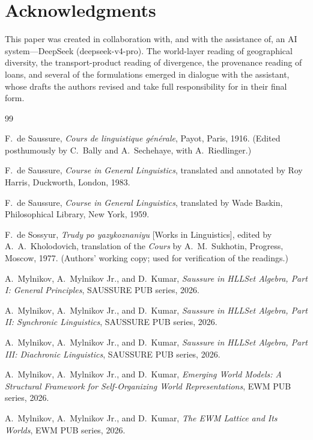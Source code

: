 \documentclass[11pt,a4paper]{article}
\theoremstyle{remark}
\begin{document}
\section*{Acknowledgments}
This paper was created in collaboration with, and with the assistance of, an
AI system---DeepSeek (deepseek-v4-pro). The world-layer reading of
geographical diversity, the transport-product reading of divergence, the
provenance reading of loans, and several of the formulations emerged in
dialogue with the assistant, whose drafts the authors revised and take full
responsibility for in their final form.

\begin{thebibliography}{99}

 F.~de Saussure,
\textit{Cours de linguistique g\'en\'erale}, Payot, Paris, 1916.
(Edited posthumously by C.~Bally and A.~Sechehaye, with A.~Riedlinger.)

 F.~de Saussure,
\textit{Course in General Linguistics}, translated and annotated by
Roy Harris, Duckworth, London, 1983.

 F.~de Saussure,
\textit{Course in General Linguistics}, translated by Wade Baskin,
Philosophical Library, New York, 1959.

 F.~de Sossyur,
\textit{Trudy po yazykoznaniyu} [Works in Linguistics], edited by
A.~A.~Kholodovich, translation of the \textit{Cours} by A.~M.~Sukhotin,
Progress, Moscow, 1977.
(Authors' working copy; used for verification of the readings.)

 A.~Mylnikov, A.~Mylnikov Jr., and D.~Kumar,
\textit{Saussure in HLLSet Algebra, Part I: General Principles},
SAUSSURE PUB series, 2026.

 A.~Mylnikov, A.~Mylnikov Jr., and D.~Kumar,
\textit{Saussure in HLLSet Algebra, Part II: Synchronic Linguistics},
SAUSSURE PUB series, 2026.

 A.~Mylnikov, A.~Mylnikov Jr., and D.~Kumar,
\textit{Saussure in HLLSet Algebra, Part III: Diachronic Linguistics},
SAUSSURE PUB series, 2026.

 A.~Mylnikov, A.~Mylnikov Jr., and D.~Kumar,
\textit{Emerging World Models: A Structural Framework for Self-Organizing
World Representations}, EWM PUB series, 2026.

 A.~Mylnikov, A.~Mylnikov Jr., and D.~Kumar,
\textit{The EWM Lattice and Its Worlds}, EWM PUB series, 2026.


\end{thebibliography}
\end{document}
